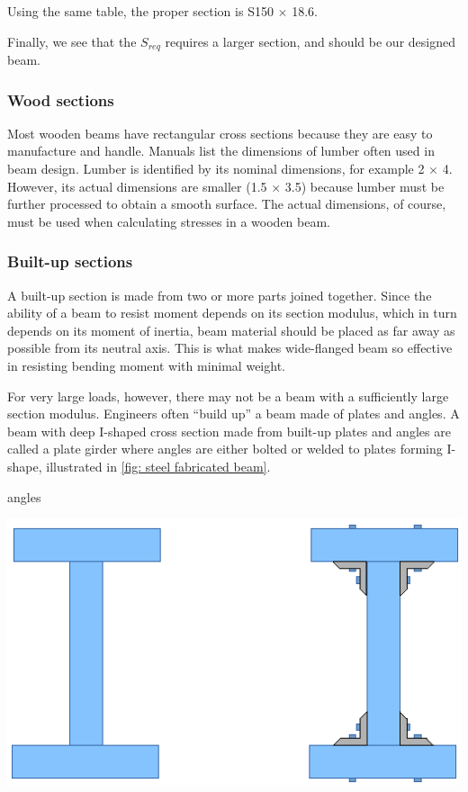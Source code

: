 \documentclass[a4paper,openany,nobib]{tufte-book}
\begin{document}
{{Using the same table, the proper section is S150 \(\times\) 18.6.

Finally, we see that the \(S_{req}\) requires a larger section, and should
be our designed beam.

\subsubsection{Wood sections}
\label{wood-sections}
Most wooden beams have rectangular cross sections because they are easy
to manufacture and handle. Manuals list the dimensions of lumber often
used in beam design. Lumber is identified by its nominal dimensions, for
example 2 \(\times\) 4. However, its actual dimensions are smaller (1.5
\(\times\) 3.5) because lumber must be further processed to obtain a
smooth surface. The actual dimensions, of course, must be used when
calculating stresses in a wooden beam.

\subsubsection{Built-up sections}
\label{built-up-sections}
A built-up section is made from two or more parts joined together. Since
the ability of a beam to resist moment depends on its section modulus,
which in turn depends on its moment of inertia, beam material should be
placed as far away as possible from its neutral axis. This is what makes
wide-flanged beam so effective in resisting bending moment with minimal
weight.

For very large loads, however, there may not be a beam with a
sufficiently large section modulus. Engineers often ``build up'' a beam
made of plates and angles. A beam with deep I-shaped cross section made
from built-up plates and angles are called a plate girder where angles
are either bolted or welded to plates forming I-shape, illustrated in
\ref{fig: steel fabricated beam}.


angles
\begin{center}
\includegraphics[width=.9\linewidth]{pictures/Simple-load-bearing/steel-fab-beams.pdf}
\label{fig: steel fabricated beam}
\end{center}

}}
\end{document}

